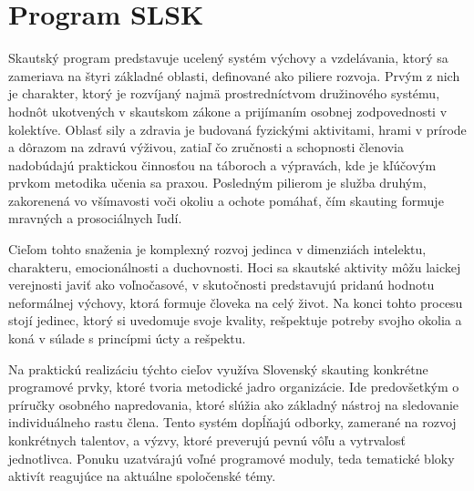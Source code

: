 \section{Program SLSK}
Skautský program predstavuje ucelený systém výchovy a vzdelávania, ktorý sa zameriava na štyri základné oblasti, definované ako piliere rozvoja. Prvým z nich je charakter, ktorý je rozvíjaný najmä prostredníctvom družinového systému, hodnôt ukotvených v skautskom zákone a prijímaním osobnej zodpovednosti v kolektíve. Oblasť sily a zdravia je budovaná fyzickými aktivitami, hrami v prírode a dôrazom na zdravú výživou, zatiaľ čo zručnosti a schopnosti členovia nadobúdajú praktickou činnosťou na táboroch a výpravách, kde je kľúčovým prvkom metodika učenia sa praxou. Posledným pilierom je služba druhým, zakorenená vo všímavosti voči okoliu a ochote pomáhať, čím skauting formuje mravných a prosociálnych ľudí.

Cieľom tohto snaženia je komplexný rozvoj jedinca v dimenziách intelektu, charakteru, emocionálnosti a duchovnosti. Hoci sa skautské aktivity môžu laickej verejnosti javiť ako voľnočasové, v skutočnosti predstavujú pridanú hodnotu neformálnej výchovy, ktorá formuje človeka na celý život. Na konci tohto procesu stojí jedinec, ktorý si uvedomuje svoje kvality, rešpektuje potreby svojho okolia a koná v súlade s princípmi úcty a rešpektu.
\cite{struktura_skautingu}

Na praktickú realizáciu týchto cieľov využíva Slovenský skauting konkrétne programové prvky, ktoré tvoria metodické jadro organizácie. Ide predovšetkým o príručky osobného napredovania, ktoré slúžia ako základný nástroj na sledovanie individuálneho rastu člena. Tento systém dopĺňajú odborky, zamerané na rozvoj konkrétnych talentov, a výzvy, ktoré preverujú pevnú vôľu a vytrvalosť jednotlivca. Ponuku uzatvárajú voľné programové moduly, teda tematické bloky aktivít reagujúce na aktuálne spoločenské témy.
\cite{noauthor_vyrocna_nodate}


